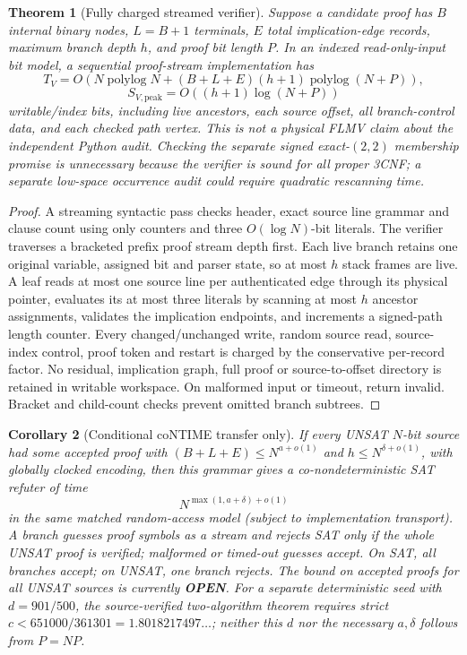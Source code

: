 \documentclass[11pt]{article}
\newtheorem{theorem}{Theorem}
\newtheorem{corollary}[theorem]{Corollary}
\begin{document}
\begin{theorem}[Fully charged streamed verifier]\label{th:resources}
Suppose a candidate proof has $B$ internal binary nodes, $L=B+1$ terminals, $E$ total implication-edge records, maximum branch depth $h$, and proof bit length $P$. In an indexed read-only-input bit model, a sequential proof-stream implementation has
\[
T_V=O\left(N\operatorname{polylog}N+(B+L+E)(h+1)\operatorname{polylog}(N+P)\right),
\]
\[
S_{V,\mathrm{peak}}=O\left((h+1)\log(N+P)\right)
\]
writable/index bits, including live ancestors, each source offset, all branch-control data, and each checked path vertex. This is not a physical FLMV claim about the independent Python audit. Checking the separate signed exact-$(2,2)$ membership promise is unnecessary because the verifier is sound for \emph{all} proper 3CNF; a separate low-space occurrence audit could require quadratic rescanning time.
\end{theorem}
\begin{proof}
A streaming syntactic pass checks header, exact source line grammar and clause count using only counters and three $O(\log N)$-bit literals. The verifier traverses a bracketed prefix proof stream depth first. Each live branch retains one original variable, assigned bit and parser state, so at most $h$ stack frames are live. A leaf reads at most one source line per authenticated edge through its physical pointer, evaluates its at most three literals by scanning at most $h$ ancestor assignments, validates the implication endpoints, and increments a signed-path length counter. Every changed/unchanged write, random source read, source-index control, proof token and restart is charged by the conservative per-record factor. No residual, implication graph, full proof or source-to-offset directory is retained in writable workspace. On malformed input or timeout, return invalid. Bracket and child-count checks prevent omitted branch subtrees.
\end{proof}

\begin{corollary}[Conditional coNTIME transfer only]\label{co:clock}
If every UNSAT $N$-bit source had some accepted proof with $(B+L+E)\le N^{a+o(1)}$ and $h\le N^{\delta+o(1)}$, with globally clocked encoding, then this grammar gives a co-nondeterministic SAT refuter of time
\[
N^{\max(1,a+\delta)+o(1)}
\]
in the same matched random-access model (subject to implementation transport). A branch guesses proof symbols as a stream and \emph{rejects SAT} only if the whole UNSAT proof is verified; malformed or timed-out guesses \emph{accept}. On SAT, all branches accept; on UNSAT, one branch rejects. The bound on accepted proofs for \emph{all} UNSAT sources is currently \textbf{OPEN}. For a separate deterministic seed with $d=901/500$, the source-verified two-algorithm theorem requires strict $c<651000/361301=1.8018217497\ldots$; neither this $d$ nor the necessary $a,\delta$ follows from $P=NP$.
\end{corollary}
\end{document}
